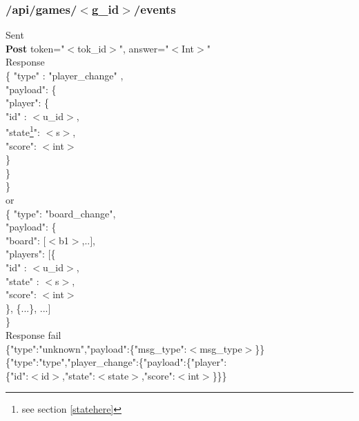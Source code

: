 \subsubsection{/api/games/$<$g\_id$>$/events} 
\tab	Sent\\
\tab\tab	\textbf{Post} token="$<$tok\_id$>$", answer="$<$Int$>$" \\
\tab	Response\\
\tab\tab	\{     "type" : "player\_change" , \\
\tab\tab	"payload": \{ \\
\tab\tab\tab	"player": \{\\
\tab\tab\tab\tab	"id" : $<$u\_id$>$, \\
\tab\tab\tab\tab	"state\footnote{see section \ref{statehere}}": $<$s$>$,\\
\tab\tab\tab\tab	"score": $<$int$>$\\ 
\tab\tab\tab\tab	\}\\
\tab\tab\tab	\}\\
\tab\tab	\}\\
    
\tab\tab	or\\

\tab\tab	\{    "type": "board\_change",\\
\tab\tab	"payload": \{\\
\tab\tab\tab	"board": $[$$<$b1$>$,..$]$,\\
\tab\tab\tab	"players": $[$\{\\
\tab\tab\tab\tab	"id" : $<$u\_id$>$, \\
\tab\tab\tab\tab	"state" : $<$s$>$, \\
\tab\tab\tab\tab	"score": $<$int$>$\\
\tab\tab\tab	\}, \{...\}, ...$]$\\
\tab\tab	\}\\
\tab	Response fail\\
\tab\tab	\{"type":"unknown","payload":\{"msg\_type":$<$msg\_type$>$\}\}\\
\tab\tab	\{"type":"type","player\_change":\{"payload":\{"player":\\
\tab\tab\tab	\{"id":$<$id$>$,"state":$<$state$>$,"score":$<$int$>$\}\}\}\\
